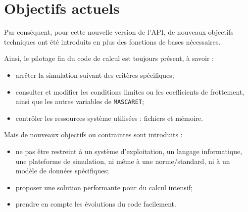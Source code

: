 \documentclass[a4paper,11pt]{article}
\begin{document}
\section{Objectifs actuels}

 Par cons\'equent, pour cette nouvelle version de l'API, de nouveaux objectifs techniques ont \'et\'e introduits en plus des fonctions de bases n\'ecessaires.
 
 \vspace{0.5cm}
 
 Ainsi, le pilotage fin du code de calcul est toujours pr\'esent, \`a savoir :
 
 \vspace{0.5cm}
 
 \begin{itemize}

   \item arr\^eter la simulation suivant des crit\`eres sp\'ecifiques;
         \vspace{0.5cm}
   \item consulter et modifier les conditions limites ou les coefficients de frottement, ainsi que les autres variables de \texttt{MASCARET};
         \vspace{0.5cm}
   \item contr\^oler les ressources syst\`eme utilis\'ees : fichiers et m\'emoire. 
 
 \end{itemize}

 \vspace{0.5cm}
 
 Mais de nouveaux objectifs ou contraintes sont introduits :
 
 \vspace{0.5cm}
 
 \begin{itemize}
 
    \item ne pas \^etre restreint \`a un syst\`eme d'exploitation, un langage informatique, une plateforme de simulation, ni m\^eme \`a une norme/standard, ni \`a un mod\`ele de donn\'ees sp\'ecifiques;
          \vspace{0.5cm}
    \item proposer une solution performante pour du calcul intensif;
          \vspace{0.5cm}
    \item prendre en compte les \'evolutions du code facilement. 
 
 \end{itemize}
\end{document}
